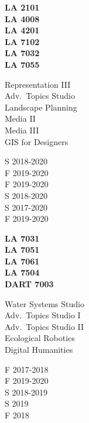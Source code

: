 \documentclass[10pt]{developercv} %
\begin{document}
\begin{minipage}[t]{0.1\textwidth} 
\textbf{LA 2101}\\
\textbf{LA 4008}\\
\textbf{LA 4201}\\
\textbf{LA 7102}\\
\textbf{LA 7032}\\
\textbf{LA 7055}\\
\end{minipage}
\begin{minipage}[t]{0.2\textwidth} 
Representation III\\
Adv.~Topics Studio\\
Landscape Planning \\
Media II \\
Media III\\
GIS for Designers\\
\end{minipage}
\begin{minipage}[t]{0.2\textwidth} 
S 2018-2020\\
F 2019-2020\\
F 2019-2020\\
S 2018-2020\\
S 2017-2020\\
F 2019-2020\\
\end{minipage}
\begin{minipage}[t]{0.15\textwidth} 
\textbf{LA 7031}\\
\textbf{LA 7051}\\
\textbf{LA 7061}\\
\textbf{LA 7504}\\
\textbf{DART 7003}\\
\end{minipage}
\begin{minipage}[t]{0.2\textwidth} 
Water Systems Studio\\
Adv.~Topics Studio I\\
Adv.~Topics Studio II\\
Ecological Robotics\\
Digital Humanities\\
\end{minipage}
\begin{minipage}[t]{0.15\textwidth} 
F 2017-2018\\
F 2019-2020\\
S 2018-2019\\
S 2019\\
F 2018\\
\end{minipage}

\end{document}
